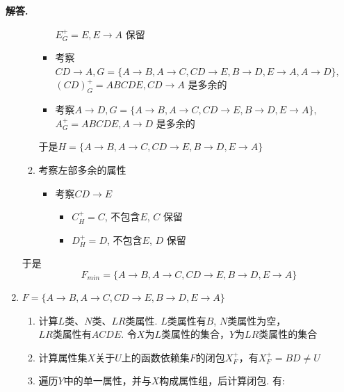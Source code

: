 \documentclass[12pt, a4paper, oneside]{ctexart}
\newenvironment{solution}{\par\noindent\textbf{解答. }}{\par}
\begin{document}
\begin{solution}
\begin{enumerate}[(1)]
\begin{enumerate}[$1^\circ$]
\begin{itemize}
                        $E_G^+ = E, E \rightarrow A$ 保留
                        \item 考察$CD \rightarrow A, G = \{ A \rightarrow B, A \rightarrow C, CD \rightarrow E, B \rightarrow D, E \rightarrow A, A \rightarrow D \},$ \\
                        $(CD)_G^+ = ABCDE, CD \rightarrow A$ 是多余的
                        \item 考察$A \rightarrow D, G = \{ A \rightarrow B, A \rightarrow C, CD \rightarrow E, B \rightarrow D, E \rightarrow A \},$ \\
                        $A_G^+ = ABCDE, A \rightarrow D$ 是多余的
                    \end{itemize}
                    于是$H = \{ A \rightarrow B, A \rightarrow C, CD \rightarrow E, B \rightarrow D, E \rightarrow A \}$
                \item 考察左部多余的属性
                    \begin{itemize}
                        \item 考察$CD \rightarrow E$
                            \begin{itemize}
                                \item $C_H^+ = C$, 不包含$E$, $C$ 保留
                                \item $D_H^+ = D$, 不包含$E$, $D$ 保留
                            \end{itemize}
                    \end{itemize}
            \end{enumerate}
            于是$$F_{min} = \{ A \rightarrow B, A \rightarrow C, CD \rightarrow E, B \rightarrow D, E \rightarrow A \}$$
            \newpage
        \item $F = \{ A \rightarrow B, A \rightarrow C, CD \rightarrow E, B \rightarrow D, E \rightarrow A \}$
            \begin{enumerate}[$1^\circ$]
                \item 计算$L$类、$N$类、$LR$类属性. $L$类属性有$B$, $N$类属性为空，\\
                $LR$类属性有$ACDE$. 令$X$为$L$类属性的集合，$Y$为$LR$类属性的集合
                \item 计算属性集$X$关于$U$上的函数依赖集$F$的闭包$X_F^+$，有$X_F^+ = BD \not= U$
                \item 遍历$Y$中的单一属性，并与$X$构成属性组，后计算闭包. 有:
                    \begin{itemize}

\end{itemize}
\end{enumerate}
\end{enumerate}
\end{solution}
\end{document}
